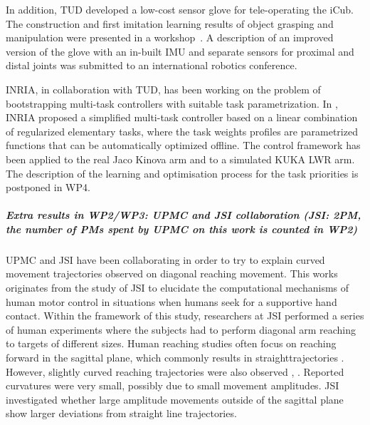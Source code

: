 In addition, TUD developed a low-cost sensor glove for tele-operating the iCub. The construction and first imitation learning results of object grasping and manipulation were presented in a workshop~\cite{RueckertICRAWS2015}. A description of an improved version of the glove with an in-built IMU and separate sensors for proximal and distal joints was submitted to an international robotics conference. 

INRIA, in collaboration with TUD, has been working on the problem of bootstrapping multi-task controllers with suitable task parametrization. 
In \cite{Modugno2016}, INRIA proposed a simplified multi-task controller based on a linear combination of regularized elementary tasks, where the task weights profiles are parametrized functions that can be automatically optimized offline. The control framework has been applied to the real Jaco Kinova arm and to a simulated KUKA LWR arm.
The description of the learning and optimisation process for the task priorities is postponed in WP4.


\subparagraph*{Extra results in WP2/WP3: UPMC and JSI collaboration (JSI: 2PM, the number of PMs spent by UPMC on this work is counted in WP2)}

UPMC and JSI have been collaborating in order to try to explain curved movement trajectories observed on diagonal reaching movement. This works originates from the study of JSI to elucidate the computational mechanisms of human motor control in situations when humans seek for a supportive hand contact. Within the framework of this study, researchers at JSI performed a series of human experiments where the subjects had to perform diagonal arm reaching to targets of different sizes. Human reaching studies often focus on reaching forward in the sagittal plane, which commonly results in straighttrajectories \cite{ThoroughmanNature2000}. However, slightly curved reaching trajectories were also observed \cite{IzawaJNeuro2008}, \cite{UnoBioCyber1989}. Reported curvatures were very small, possibly due to small movement amplitudes. JSI investigated whether large amplitude movements outside of the sagittal plane show larger deviations from straight line trajectories.

